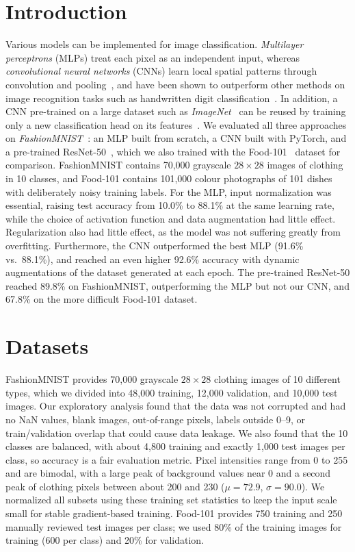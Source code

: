 \documentclass[11pt]{article}
\begin{document}
\section{Introduction}
Various models can be implemented for image classification.
\textit{Multilayer perceptrons} (MLPs) treat each pixel as an independent input, whereas \textit{convolutional neural
networks} (CNNs) learn local spatial patterns through convolution and pooling~\cite{Goodfellow-et-al-2016},
and have been shown to outperform other methods on image recognition tasks such as handwritten digit
classification~\cite{726791}.
In addition, a CNN pre-trained on a large dataset such as \textit{ImageNet}~\cite{5206848} can be
reused by training only a new classification head on its features~\cite{7301270}.
We evaluated all three approaches on \textit{FashionMNIST}~\cite{fashionmnist}: an MLP built from scratch, a CNN
built with PyTorch, and a pre-trained ResNet-50~\cite{Resnet50}, which we also trained with the
Food-101~\cite{bossard14} dataset for comparison.
FashionMNIST contains 70,000 grayscale $28\times28$ images of clothing in 10 classes, and
Food-101 contains 101,000 colour photographs of 101 dishes with deliberately noisy training labels.
For the MLP, input normalization was essential, raising test accuracy from 10.0\% to 88.1\% at the same
learning rate, while the choice of activation function and data augmentation had little effect.
Regularization also had little effect, as the model was not suffering greatly from overfitting.
Furthermore, the CNN outperformed the best MLP (91.6\% vs.\ 88.1\%), and reached an even higher 92.6\%
accuracy with dynamic augmentations of the dataset generated at each epoch.
The pre-trained ResNet-50 reached 89.8\% on FashionMNIST, outperforming the MLP but not our CNN, and
67.8\% on the more difficult Food-101 dataset.

\section{Datasets}
FashionMNIST provides 70,000 grayscale $28\times28$ clothing images of 10 different types, which we divided
into 48,000 training, 12,000 validation, and 10,000 test images.
Our exploratory analysis found that the data was not corrupted and had no NaN values, blank images,
out-of-range pixels, labels outside 0--9, or train/validation overlap that could cause data leakage.
We also found that the 10 classes are balanced, with about 4,800 training and exactly 1,000 test images per
class, so accuracy is a fair evaluation metric.
Pixel intensities range from 0 to 255 and are bimodal, with a large peak of background values near 0 and
a second peak of clothing pixels between about 200 and 230 ($\mu = 72.9$, $\sigma = 90.0$).
We normalized all subsets using these training set statistics to keep the input scale small for stable
gradient-based training.
Food-101 provides 750 training and 250 manually reviewed test images per class; we used 80\% of the
training images for training (600 per class) and 20\% for validation.
\end{document}

